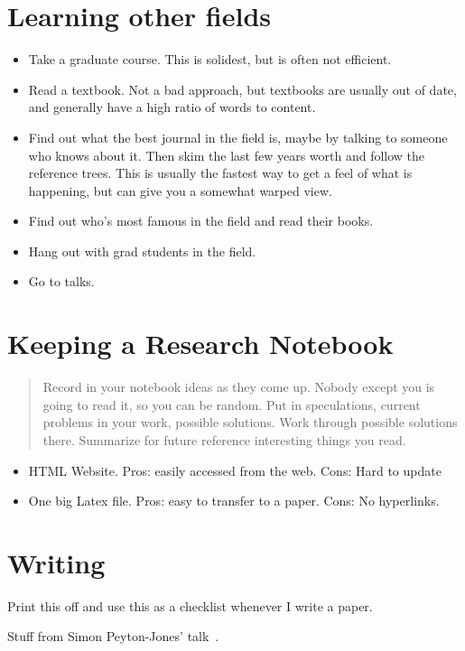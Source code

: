 \section{Learning other fields}
\begin{itemize}
\item Take a graduate course. This is solidest, but is often not efficient.
\item Read a textbook. Not a bad approach, but textbooks are usually out of date, and generally have a high ratio of words to content.
\item Find out what the best journal in the field is, maybe by talking to someone who knows about it. Then skim the last few years worth and follow the reference trees. This is usually the fastest way to get a feel of what is happening, but can give you a somewhat warped view.
\item Find out who’s most famous in the field and read their books.
\item Hang out with grad students in the field.
\item Go to talks. 
\end{itemize}

\section{Keeping a Research Notebook}
\blockquote{Record in your notebook ideas as they come up. Nobody except you is going
to read it, so you can be random. Put in speculations, current problems in your
work, possible solutions. Work through possible solutions there. Summarize for
future reference interesting things you read.}


\begin{itemize}
\item HTML Website. Pros: easily accessed from the web. Cons: Hard to update
\item One big Latex file. Pros: easy to transfer to a paper. Cons: No hyperlinks.
\end{itemize}

\section{Writing}
Print this off and use this as a checklist whenever I write a paper.

Stuff from Simon Peyton-Jones' talk~\cite{jones2013how}.
